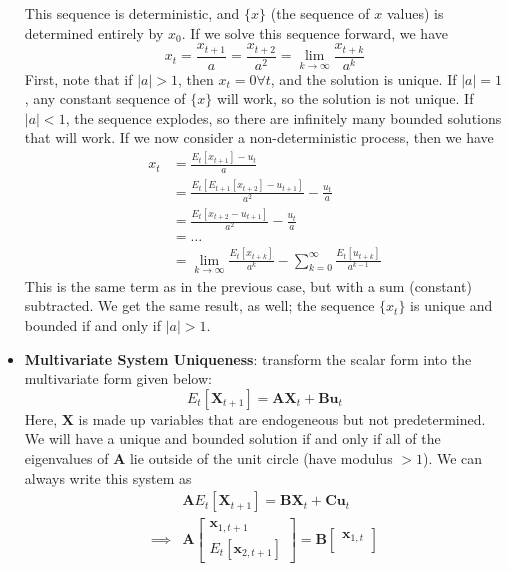 \documentclass[12pt]{article}
\begin{document}
\begin{itemize}
    This sequence is deterministic, and $\{x\}$ (the sequence of $x$ values) is determined entirely by $x_0$. If we solve this sequence forward, we have
    \[x_t = \frac{x_{t+1}}{a} = \frac{x_{t+2}}{a^2} = \lim_{k\to\infty}\frac{x_{t+k}}{a^k}\]
    First, note that if $|a|>1$, then $x_t = 0 \forall t$, and the solution is unique. If $|a| = 1$, any constant sequence of $\{x\}$ will work, so the solution is not unique. If $|a| < 1$, the sequence explodes, so there are infinitely many bounded solutions that will work. If we now consider a non-deterministic process, then we have
    \begin{equation}\label{Unique and Bounded Solution}
        \begin{split}
            x_t &= \frac{E_t[x_{t+1}] - u_t}{a} \\
            &= \frac{E_t[E_{t+1}[x_{t+2}] - u_{t+1}]}{a^2} - \frac{u_t}{a} \\
            &= \frac{E_t[x_{t+2} - u_{t+1}]}{a^2} - \frac{u_t}{a} \\
            &= \hdots \\
            &= \lim_{k\to\infty}\frac{E_t[x_{t+k}]}{a^k} - \sum_{k=0}^{\infty} \frac{E_t[u_{t+k}]}{a^{k-1}}
        \end{split}
    \end{equation}
    This is the same term as in the previous case, but with a sum (constant) subtracted. We get the same result, as well; the sequence $\{x_t\}$ is unique and bounded if and only if $|a| > 1$.
    \item \textbf{Multivariate System Uniqueness}: transform the scalar form into the multivariate form given below:
    \[E_t[\textbf{X}_{t+1}] = \textbf{A}\textbf{X}_t + \textbf{B}\textbf{u}_t\]
    Here, $\textbf{X}$ is made up variables that are endogeneous but not predetermined. We will have a unique and bounded solution if and only if all of the eigenvalues of $\textbf{A}$ lie outside of the unit circle (have modulus $>1$). We can always write this system as
    \[\begin{split}
        &\textbf{A}E_t[\textbf{X}_{t+1}] = \textbf{B}\textbf{X}_t + \textbf{C}\textbf{u}_t \\
        \implies &\textbf{A}\begin{bmatrix}
        \textbf{x}_{1,t+1} \\
        E_t[\textbf{x}_{2,t+1}]
        \end{bmatrix} = \textbf{B}\begin{bmatrix}
        \textbf{x}_{1,t}\\

\end{bmatrix}
\end{split}\]
\end{itemize}
\end{document}
